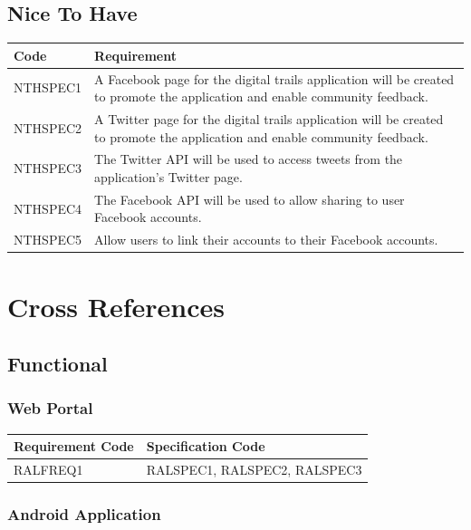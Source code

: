 \documentclass[11pt,a4paper]{article}
\begin{document}
\subsection{Nice To Have}
\label{sec:nice-to-have-specs}

\begin{longtable}{|p{2.5cm}p{13cm}|}
\hline
\textbf{Code} & \textbf{Requirement} \\

\hline
NTHSPEC1 & A Facebook page for the digital trails application will be created to promote the application and enable community feedback. \\ \hline
NTHSPEC2 &  A Twitter page for the digital trails application will be created to promote the application and enable community feedback. \\ \hline
NTHSPEC3 & The Twitter API will be used to access tweets from the application's Twitter page. \\ \hline
NTHSPEC4 & The Facebook API will be used to allow sharing to user Facebook accounts. \\ \hline
NTHSPEC5 & Allow users to link their accounts to their Facebook accounts. \\ \hline
\end{longtable}


\section{Cross References}
\label{sec:cross-refs}

\subsection{Functional}

\subsubsection{Web Portal}

\begin{longtable}{|p{2.7cm}|p{10cm}|}
\hline
\textbf{Requirement Code} & \textbf{Specification Code} \\

\hline \hline RALFREQ1 & RALSPEC1, RALSPEC2, RALSPEC3  \\
\hline 
\end{longtable}


\subsubsection{Android Application}
\end{document}

